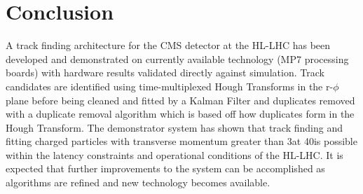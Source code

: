 \section{Conclusion}\label{sec:conclusion}

A track finding architecture for the CMS detector at the HL-LHC has been developed and demonstrated on currently available technology (MP7 processing boards) with hardware results validated directly against simulation. Track candidates are identified using time-multiplexed Hough Transforms in the r-$\phi$ plane before being cleaned and fitted by a Kalman Filter and duplicates removed with a duplicate removal algorithm which is based off how duplicates form in the Hough Transform. The demonstrator system has shown that track finding and fitting charged particles with transverse momentum greater than 3\GeV at 40\MHz is possible within the latency constraints and operational conditions of the HL-LHC. It is expected that further improvements to the system can be accomplished as algorithms are refined and new technology becomes available.